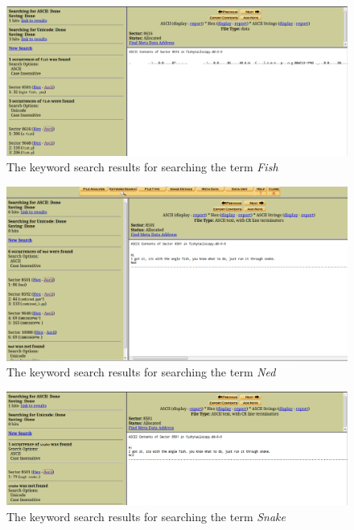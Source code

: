 \documentclass[12pt]{article}
\begin{document}
				\begin{figure}[h]
					\centering
					\includegraphics[width=12cm]{Images/FishKeyWord.png}
					\caption{The keyword search results for searching the term \textit{Fish}}
				\end{figure}

				\clearpage

				\begin{figure}[h]
					\centering
					\includegraphics[width=12cm]{Images/NedKeyWord.png}
					\caption{The keyword search results for searching the term \textit{Ned}}
				\end{figure}	

				\begin{figure}[h]
					\centering
					\includegraphics[width=12cm]{Images/SnakeKeyWord.png}
					\caption{The keyword search results for searching the term \textit{Snake}}
				\end{figure}

	
\end{document}
